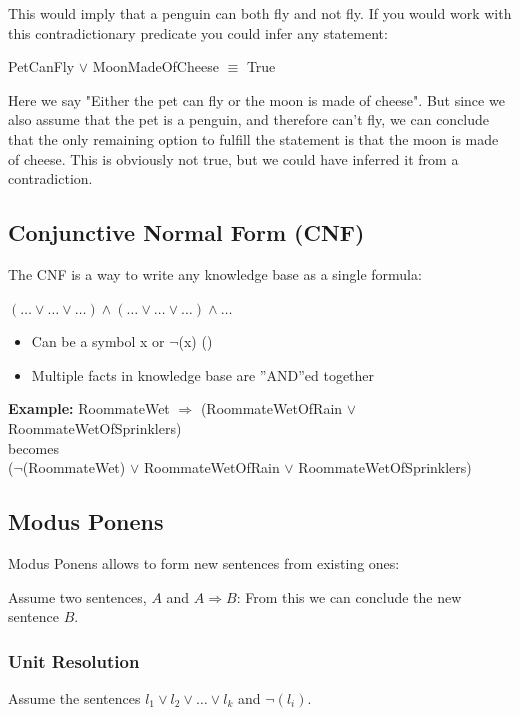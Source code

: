 \documentclass[
../EiKI_Summary.tex,
]
{subfiles}
\begin{document}
This would imply that a penguin can both fly and not fly. If you would work with this contradictionary predicate you could infer any statement:

PetCanFly $\lor$ MoonMadeOfCheese $\equiv$ True

Here we say "Either the pet can fly or the moon is made of cheese". But since we also assume that the pet is a penguin, and therefore can't fly, we can conclude that the only remaining option to fulfill the statement is that the moon is made of cheese. This is obviously not true, but we could have inferred it from a contradiction.

\subsection{Conjunctive Normal Form (CNF)}
The CNF is a way to write any knowledge base as a single formula:

\begin{defbox}
    \begin{center}
        $(\dots\lor\dots\lor\dots) \land (\dots\lor\dots\lor\dots) \land \dots$
    \end{center}
    \begin{itemize}
        \item Can be a symbol x or $\neg$(x) ()
        \item Multiple facts in knowledge base are ''AND''ed together
    \end{itemize}
\end{defbox}

\textbf{Example:}
RoommateWet $\Rightarrow$ (RoommateWetOfRain $\lor$ RoommateWetOfSprinklers)\\
becomes\\
($\neg$(RoommateWet) $\lor$ RoommateWetOfRain $\lor$ RoommateWetOfSprinklers)

\subsection{Modus Ponens}
Modus Ponens allows to form new sentences from existing ones:

Assume two sentences, $A$ and $A \Rightarrow B$: From this we can conclude the new sentence $B$.

\subsubsection{Unit Resolution}
Assume the sentences $l_1 \lor l_2 \lor \dots \lor l_k$ and $\neg(l_i)$. 
\end{document}
